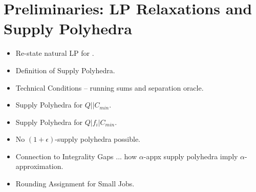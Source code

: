 \newpage
\section{Preliminaries: LP Relaxations and Supply Polyhedra}
\begin{itemize}[noitemsep]
	\item Re-state natural LP for \mckc.
	\item Definition of Supply Polyhedra.
	\item Technical Conditions -- running sums and separation oracle.
	\item Supply Polyhedra for $Q||C_{min}$.
	\item Supply Polyhedra for $Q|f_i|C_{min}$.
	\item No $(1+\epsilon)$-supply polyhedra possible.
	\item Connection to Integrality Gaps ... how $\alpha$-appx supply polyhedra imply $\alpha$-approximation.
	\item Rounding Assignment  for Small Jobs.
\end{itemize}